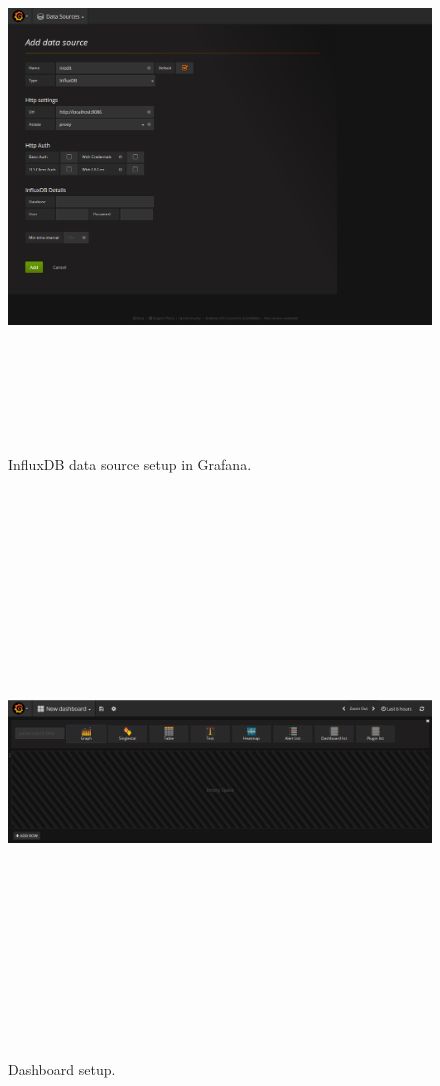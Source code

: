 \begin{figure}[htpb]
	\centering
	\includegraphics[width=16cm,height=15cm,keepaspectratio=true]{images/gr_db_setup}
	\caption{
		InfluxDB data source setup in Grafana.
	}
	\label{fig:gr_db_setup}
\end{figure}



\begin{figure}[htpb]
	\centering
	\includegraphics[width=16cm,height=15cm,keepaspectratio=true]{images/dashboard}
	\caption{
		Dashboard setup.
	}
	\label{fig:dashboard}
\end{figure}

